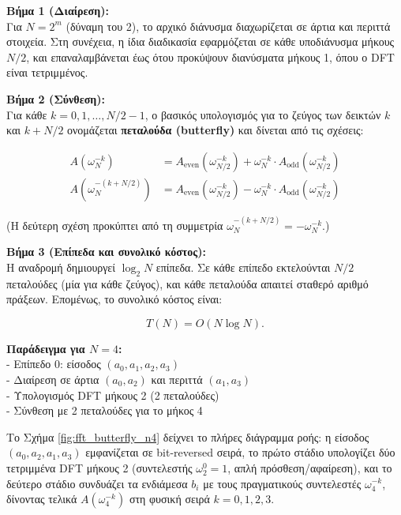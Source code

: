 \textbf{Βήμα 1 (Διαίρεση):}\\
Για \(N = 2^m\) (δύναμη του 2), το αρχικό διάνυσμα διαχωρίζεται σε άρτια
και περιττά στοιχεία. Στη συνέχεια, η ίδια διαδικασία εφαρμόζεται σε
κάθε υποδιάνυσμα μήκους \(N/2\), και επαναλαμβάνεται έως ότου προκύψουν
διανύσματα μήκους 1, όπου ο DFT είναι τετριμμένος.

\textbf{Βήμα 2 (Σύνθεση):}\\
Για κάθε \(k = 0, 1, \dots, N/2 - 1\), ο βασικός υπολογισμός για το
ζεύγος των δεικτών \(k\) και \(k+N/2\) ονομάζεται \textbf{πεταλούδα
(butterfly)} και δίνεται από τις σχέσεις:

\[
\begin{aligned}
A(\omega_N^{-k}) &= A_{\text{even}}(\omega_{N/2}^{-k}) + \omega_N^{-k} \cdot A_{\text{odd}}(\omega_{N/2}^{-k}) \\
A(\omega_N^{-(k+N/2)}) &= A_{\text{even}}(\omega_{N/2}^{-k}) - \omega_N^{-k} \cdot A_{\text{odd}}(\omega_{N/2}^{-k})
\end{aligned}
\]

(Η δεύτερη σχέση προκύπτει από τη συμμετρία
\(\omega_N^{-(k+N/2)} = -\omega_N^{-k}\).)

\textbf{Βήμα 3 (Επίπεδα και συνολικό κόστος):}\\
Η αναδρομή δημιουργεί \(\log_2 N\) επίπεδα. Σε κάθε επίπεδο εκτελούνται
\(N/2\) πεταλούδες (μία για κάθε ζεύγος), και κάθε πεταλούδα απαιτεί
σταθερό αριθμό πράξεων. Επομένως, το συνολικό κόστος είναι:

\[
T(N) = O(N \log N).
\]

\textbf{Παράδειγμα για \(N=4\):}\\
- Επίπεδο 0: είσοδος \((a_0,a_1,a_2,a_3)\)\\
- Διαίρεση σε άρτια \((a_0,a_2)\) και περιττά \((a_1,a_3)\)\\
- Υπολογισμός DFT μήκους 2 (2 πεταλούδες)\\
- Σύνθεση με 2 πεταλούδες για το μήκος 4

Το Σχήμα \ref{fig:fft_butterfly_n4} δείχνει το πλήρες διάγραμμα ροής: η
είσοδος \((a_0,a_2,a_1,a_3)\) εμφανίζεται σε bit-reversed σειρά, το
πρώτο στάδιο υπολογίζει δύο τετριμμένα DFT μήκους 2 (συντελεστής
\(\omega_2^0=1\), απλή πρόσθεση/αφαίρεση), και το δεύτερο στάδιο
συνδυάζει τα ενδιάμεσα \(b_i\) με τους πραγματικούς συντελεστές
\(\omega_4^{-k}\), δίνοντας τελικά \(A(\omega_4^{-k})\) στη φυσική σειρά
\(k=0,1,2,3\).

